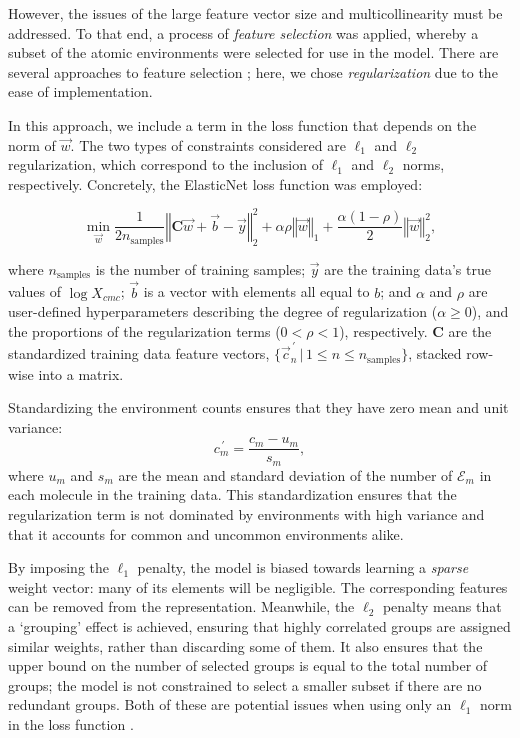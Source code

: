 However, the issues of the large feature vector size and multicollinearity must
be addressed. To that end, a process of \emph{feature selection} was applied,
whereby a subset of the atomic environments were selected for use in the model.
There are several approaches to feature selection
\cite{liFeatureSelectionData2017}; here, we chose \emph{regularization} due to
the ease of implementation.

In this approach, we include a term in the loss function that depends on the
norm of $\vec{w}$. The two types of constraints considered are $\ell_1$ and
$\ell_2$ regularization, which correspond to the inclusion of $\ell_1$ and
$\ell_2$ norms, respectively. Concretely, the ElasticNet
\cite{zouRegularizationVariableSelection2005} loss function was employed:

\begin{equation}
    \label{eq:elastic}
    \min_{\vec{w}} { \frac{1}{2n_{\text{samples}}} \left \Vert \mathbf{C}\vec{w} + \vec{b}- \vec{y} \right \Vert_2 ^ 2 + \alpha\rho \left \Vert \vec{w} \right \Vert_1} + \frac{\alpha(1 - \rho)}{2} \left \Vert \vec{w} \right \Vert_2^2,
\end{equation}

where $n_{\text{samples}}$ is the number of training samples; $\vec{y}$ are the
training data's true values of $\log X_{cmc}$; $\vec{b}$ is a vector with
elements all equal to $b$; and $\alpha$ and $\rho$ are user-defined
hyperparameters describing the degree of regularization ($\alpha \geq 0$), and
the proportions of the regularization terms ($0 < \rho < 1$), respectively.
$\mathbf{C}$ are the standardized training data feature vectors,
$\{\vec{c}^{\,\prime}_n \,|\, 1 \leq n \leq n_\text{samples}\}$, stacked
row-wise into a matrix.

Standardizing the environment counts ensures that they have zero mean and unit variance:
\begin{equation}
    \label{eq:standard-scaling}
    {c}^{\,\prime}_m = \frac{c_m - u_m}{s_m},
\end{equation}
where $u_m$ and $s_m$ are the mean and standard deviation of the number of
$\mathcal{E}_m$ in each molecule in the training data. This standardization
ensures that the regularization term is not dominated by environments with high
variance and that it accounts for common and uncommon environments alike.

By imposing the $\ell_1$ penalty, the model is biased towards learning a
\emph{sparse} weight vector: many of its elements will be negligible. The
corresponding features can be removed from the representation. Meanwhile, the
$\ell_2$ penalty means that a `grouping' effect is achieved, ensuring that
highly correlated groups are assigned similar weights, rather than discarding
some of them. It also ensures that the upper bound on the number of selected
groups is equal to the total number of groups; the model is not constrained to
select a smaller subset if there are no redundant groups. Both of these are
potential issues when using only an $\ell_1$ norm in the loss function
\cite{efronLeastAngleRegression2004,zouRegularizationVariableSelection2005}.

